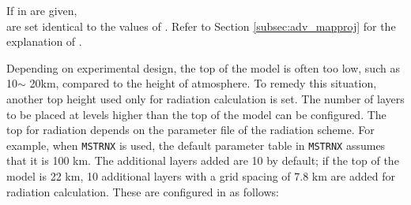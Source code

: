 If  in  are given, \\
 are set identical to the values of 
.
Refer to Section \ref{subsec:adv_mapproj} for the explanation of .


Depending on experimental design, the top of the model is often too low, such as 10$\sim$ 20km, compared to the height of atmosphere. To remedy this situation, another top height used only for radiation calculation is set. The number of layers to be placed at levels higher than the top of the model can be configured. The top for radiation depends on the parameter file of the radiation scheme. For example, when \verb|MSTRNX| is used, the default parameter table in \verb|MSTRNX| assumes that it is 100 km. The additional layers added are 10 by default; if the top of the model is 22 km, 10 additional layers with a grid spacing of 7.8 km are added for radiation calculation. These are configured in  as follows:

